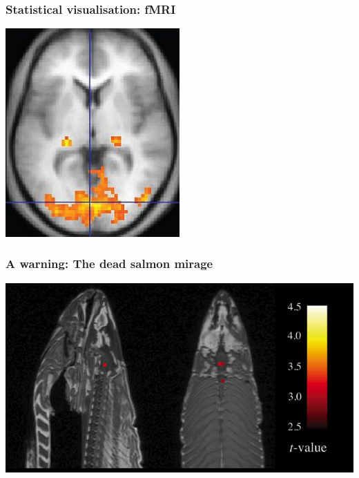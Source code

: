 \documentclass{beamer}
\newcommand{\pnote}[1] {}
\begin{document}

\begin{frame}
  \frametitle{Statistical visualisation: fMRI}
  \centering
  \includegraphics[width=0.5\textwidth]{figures/brain-fmri}
\end{frame}

\begin{frame}
  \frametitle{A warning: The dead salmon mirage}
  \includegraphics[width=\textwidth]{figures/fmri-salmon}
\end{frame}
\pnote{ It is quite easy to draw the wrong conclusions from
  applying machine learning / statistics to your data. For example, it
  was fashionable to perform fMRI studies in humans to see whether
  some neurons have a particular functional role. So some scientists
  tried to replicate those results. They took a dead salmon, and put
  it an fMRI scanner. They checked its brain activity when it was
  shown images of happy or sad people. Perhaps surprisingly, they
  found an area of the brain that was correlated with the pictures -
  so it seemed, as though the dead salmon could distinguish photos of
  happy people from sad ones. However, this was all due to a
  misapplication of statistics. In this course, we will try and teach
  you to avoid such mistakes.  }
\end{document}
